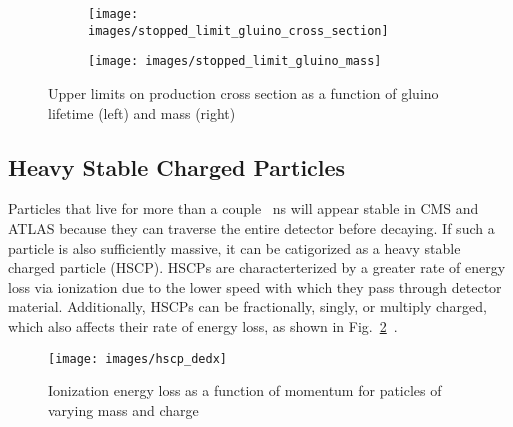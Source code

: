 \documentclass[12pt]{article}
\begin{document}
        \noindent \begin{figure}[htbp] \begin{center}
        \begin{subfigure}[htbp]{0.5\textwidth} \begin{center}
        \texttt{[image: images/stopped\_limit\_gluino\_cross\_section]}
        \end{center} \end{subfigure}
        \begin{subfigure}[htbp]{0.45\textwidth} \begin{center}
        \texttt{[image: images/stopped\_limit\_gluino\_mass]}
        \end{center} \end{subfigure}
            \caption{Upper limits on production cross section as a function of gluino lifetime (left) and mass (right)~\cite{cms_stopped}}
        \label{stopped_limits}
        \end{center} \end{figure}

    \subsection{Heavy Stable Charged Particles}
        Particles that live for more than a couple \SI{}{ns} will appear stable in CMS and ATLAS because they can traverse the entire detector before decaying. If such a particle is also sufficiently massive, it can be catigorized as a heavy stable charged particle (HSCP). HSCPs are characterterized by a greater rate of energy loss via ionization due to the lower speed with which they pass through detector material. Additionally, HSCPs can be fractionally, singly, or multiply charged, which also affects their rate of energy loss, as shown in Fig.~\ref{hscp_dedx}~\cite{cms_hscp}.

        \noindent \begin{figure}[htbp] \begin{center}
        \texttt{[image: images/hscp\_dedx]}
            \caption{Ionization energy loss as a function of momentum for paticles of varying mass and charge~\cite{cms_hscp}}
        \label{hscp_dedx}
        \end{center} \end{figure}
\end{document}

